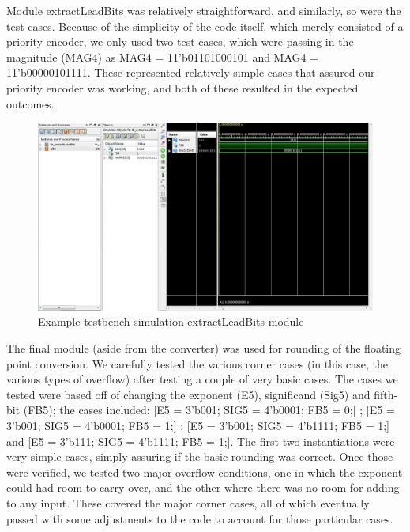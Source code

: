 \documentclass{article}
\begin{document}
Module extractLeadBits was relatively straightforward, and similarly, so were the test cases.  Because of the simplicity of the code itself, which merely consisted of a priority encoder, we only used two test cases, which were passing in the magnitude (MAG4) as MAG4 = 11'b01101000101 and MAG4 = 11'b00000101111.  These represented relatively simple cases that assured our priority encoder was working, and both of these resulted in the expected outcomes.


\begin{figure}[H]
	\begin{center}
		\includegraphics[width=1.2\textwidth]{extractLeadingBitsSim.png} 
		\caption{Example testbench simulation extractLeadBits module}
	\end{center}
\end{figure}


The final module (aside from the converter) was used for rounding of the floating point conversion.  We carefully tested the various corner cases (in this case, the various types of overflow) after testing a couple of very basic cases.  The cases we tested were based off of changing the exponent (E5), significand (Sig5) and fifth-bit (FB5); the cases included: [E5 = 3'b001; SIG5 = 4'b0001; FB5 = 0;] ; [E5 = 3'b001; SIG5 = 4'b0001; FB5 = 1;] ; [E5 = 3'b001; SIG5 = 4'b1111; FB5 = 1;] and [E5 = 3'b111; SIG5 = 4'b1111; FB5 = 1;].  The first two instantiations were very simple cases, simply assuring if the basic rounding was correct.  Once those were verified, we tested two major overflow conditions, one in which the exponent could had room to carry over, and the other where there was no room for adding to any input.  These covered the major corner cases, all of which eventually passed with some adjustments to the code to account for those particular cases. 
\end{document}
